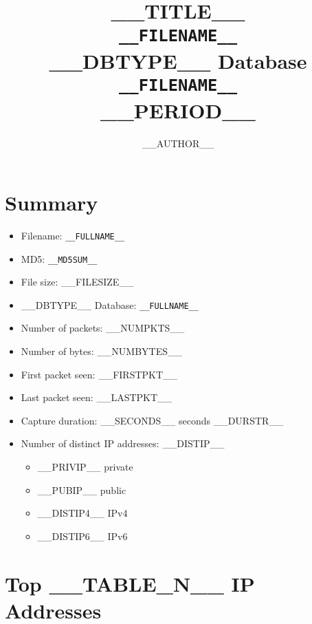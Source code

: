 \documentclass[10pt,a4paper,titlepage]{article}
\title{%
    \HRule{0.5pt}\\[0.2cm]
    \Huge\textbf{__TITLE__}\\[0.2cm]
    \Large\texttt{__FILENAME__}\\
    \Large __DBTYPE__ Database\\
    \texttt{__FILENAME__}\\[0.2cm]
    \large __PERIOD__
    \HRule{2pt}\\[3.0cm]
}
\author{__AUTHOR__}
\let\stdsection\section
\renewcommand\section{\clearpage\stdsection}
\begin{document}


\maketitle

\tableofcontents


\section{Summary}
    \begin{itemize}
        \item Filename: {\tt __FULLNAME__}
        \item MD5: {\tt __MD5SUM__}
        \item File size: __FILESIZE__
        \item __DBTYPE__ Database: {\tt __FULLNAME__}
        \item Number of packets: __NUMPKTS__
        \item Number of bytes: __NUMBYTES__
        \item First packet seen: __FIRSTPKT__
        \item Last packet seen: __LASTPKT__
        \item Capture duration: __SECONDS__ seconds __DURSTR__
        \item Number of distinct IP addresses: __DISTIP__
            \begin{itemize}
                \item __PRIVIP__ private
                \item __PUBIP__ public
                \item __DISTIP4__ IPv4
                \item __DISTIP6__ IPv6
            \end{itemize}
    \end{itemize}

\section{Top __TABLE_N__ IP Addresses}
\end{document}
